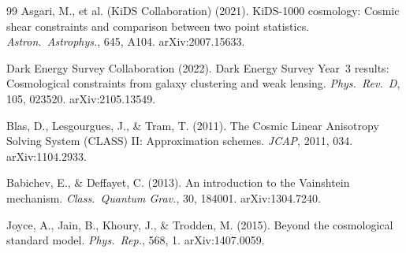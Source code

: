 \documentclass[12pt,a4paper]{article}
\begin{document}
\begin{thebibliography}{99}
  Asgari, M., et al. (KiDS Collaboration) (2021).
  KiDS-1000 cosmology: Cosmic shear constraints and comparison between two
  point statistics.
  \textit{Astron.\ Astrophys.}, 645, A104.
  arXiv:2007.15633.

  Dark Energy Survey Collaboration (2022).
  Dark Energy Survey Year~3 results: Cosmological constraints from galaxy
  clustering and weak lensing.
  \textit{Phys.\ Rev.\ D}, 105, 023520.
  arXiv:2105.13549.

  Blas, D., Lesgourgues, J., \& Tram, T. (2011).
  The Cosmic Linear Anisotropy Solving System (CLASS) II: Approximation
  schemes.
  \textit{JCAP}, 2011, 034.
  arXiv:1104.2933.

  Babichev, E., \& Deffayet, C. (2013).
  An introduction to the Vainshtein mechanism.
  \textit{Class.\ Quantum Grav.}, 30, 184001.
  arXiv:1304.7240.

  Joyce, A., Jain, B., Khoury, J., \& Trodden, M. (2015).
  Beyond the cosmological standard model.
  \textit{Phys.\ Rep.}, 568, 1.
  arXiv:1407.0059.

\end{thebibliography}
\end{document}
